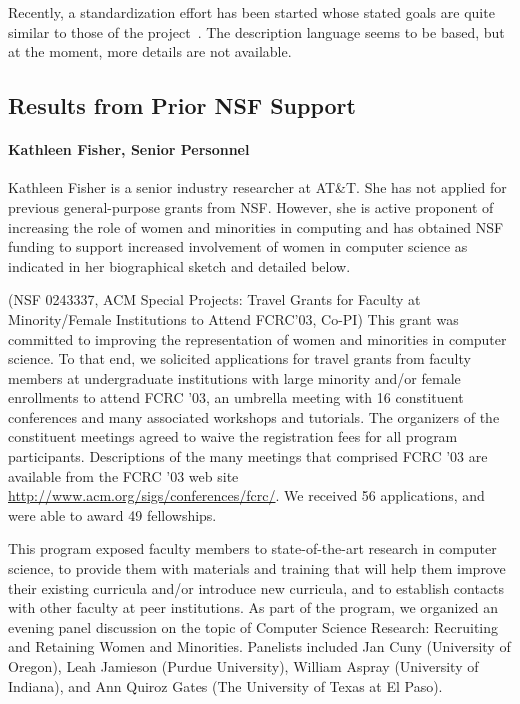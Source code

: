\documentclass[11pt]{article}
\begin{document}
Recently, a standardization effort has been started whose stated goals are quite similar to those of the \pads{} project~\cite{dfdl}. The description
language seems to be \xml{} based, but at the moment, more details are 
not available.

\subsection{Results from Prior NSF Support}
\label{ssec:results}

\paragraph*{Kathleen Fisher, Senior Personnel} 
Kathleen Fisher is a senior industry researcher at AT\&T.
She has not applied for previous general-purpose grants from NSF.
However, she is active proponent of increasing the
role of women and minorities in computing and has
obtained NSF funding to support increased involvement of women
in computer science as indicated in her biographical sketch
and detailed below.

(NSF 0243337, ACM Special Projects: 
Travel Grants for Faculty at Minority/Female Institutions to Attend
FCRC'03, Co-PI) This grant was committed to improving the representation of women and
minorities in computer science. To that end, we solicited applications
for travel grants from faculty members at undergraduate institutions
with large minority and/or female enrollments to attend FCRC '03, an
umbrella meeting with 16 constituent conferences and many associated
workshops and tutorials.  The organizers of the constituent meetings agreed to waive
the registration fees for all program participants. 
Descriptions of the many meetings that
comprised FCRC '03 are available from the FCRC '03 web site 
\url{http://www.acm.org/sigs/conferences/fcrc/}.  We
received 56 applications, and were able to award 49
fellowships.

This program exposed faculty members to state-of-the-art research in
computer science, to provide them with materials and training that
will help them improve their existing curricula and/or introduce new
curricula, and to establish contacts with other faculty at peer
institutions.  As part of the program, we organized an evening panel
discussion on the topic of Computer Science Research: Recruiting and
Retaining Women and Minorities.  Panelists included Jan Cuny
(University of Oregon), Leah Jamieson (Purdue University), William
Aspray (University of Indiana), and Ann Quiroz Gates (The University
of Texas at El Paso).  
\end{document}
